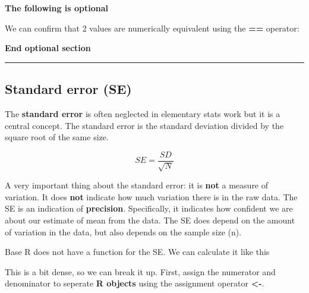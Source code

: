 \documentclass[]{book}
\newenvironment{Shaded}{\begin{snugshade}}{\end{snugshade}}
\newcommand{\KeywordTok}[1]{\textcolor[rgb]{0.13,0.29,0.53}{\textbf{#1}}}
\newcommand{\StringTok}[1]{\textcolor[rgb]{0.31,0.60,0.02}{#1}}
\newcommand{\OperatorTok}[1]{\textcolor[rgb]{0.81,0.36,0.00}{\textbf{#1}}}
\newcommand{\NormalTok}[1]{#1}
\theoremstyle{definition}
\theoremstyle{definition}
\theoremstyle{definition}
\theoremstyle{remark}
\begin{document}
\textbf{The following is optional}

We can confirm that 2 values are numerically equivalent using the
\textbf{==} operator:

\begin{Shaded}
\end{Shaded}

\textbf{End optional section}

\begin{center}\rule{0.5\linewidth}{\linethickness}\end{center}

\subsection{Standard error (SE)}\label{standard-error-se}

The \textbf{standard error} is often neglected in elementary stats work
but it is a central concept. The standard error is the standard
deviation divided by the square root of the same size.

\[SE = \frac{SD}{\sqrt{N}}\]

A very important thing about the standard error: it is \textbf{not} a
measure of variation. It does \textbf{not} indicate how much variation
there is in the raw data. The SE is an indication of \textbf{precision}.
Specifically, it indicates how confident we are about our estimate of
mean from the data. The SE does depend on the amount of variation in the
data, but also depends on the sample size (n).

Base R does not have a function for the SE. We can calculate it like
this

\begin{Shaded}
\end{Shaded}

This is a bit dense, so we can break it up. First, assign the numerator
and denominator to seperate \textbf{R objects} using the assignment
operator \textbf{\textless{}-}.
\end{document}
